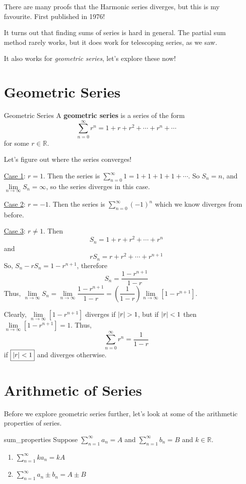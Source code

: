 \begin{Remark}{}{}
    There are many proofs that the Harmonic series diverges, but this is my favourite.
    First published in 1976!
\end{Remark}
It turns out that finding sums of series is hard in general. The partial
sum method rarely works, but it does work for telescoping series, as we saw.

It also works for \emph{geometric series}, let's explore these now!

\section{Geometric Series}
\begin{Definition}{Geometric Series}{}
    A \textbf{geometric series} is a series of the form
    \[ \sum\limits_{n=0}^{\infty} r^n=1+r+r^2+\cdots+r^n+\cdots \]
    for some $ r\in\mathbb{R} $.
\end{Definition}
Let's figure out where the series converges!

\underline{Case 1}: $ r=1 $. Then the series is
$ \sum\limits_{n=0}^{\infty} 1=1+1+1+1+\cdots $.
So $ S_n=n $, and $ \lim\limits_{{n} \to {\infty}} S_n =\infty $, so the series
diverges in this case.

\underline{Case 2}: $ r=-1 $. Then the series is $ \sum\limits_{n=0}^{\infty} (-1)^n $
which we know diverges from before.

\underline{Case 3}: $ r\neq 1 $. Then
\[ S_n=1+r+r^2+\cdots+r^n \]
and
\[ rS_n=r+r^2+\cdots+r^{n+1} \]
So, $ S_n-rS_n=1-r^{n+1} $, therefore
\[ S_n=\frac{1-r^{n+1}}{1-r} \]
Thus, $ \lim\limits_{{n} \to {\infty}} S_n=\lim\limits_{{n} \to {\infty}} \dfrac{1-r^{n+1}}{1-r}
    =
    \left( \dfrac{1}{1-r} \right) \lim\limits_{{n} \to {\infty}} \left[1-r^{n+1}\right] $.

Clearly, $ \lim\limits_{{n} \to {\infty}} \left[1-r^{n+1}\right] $ diverges if $ \lvert r\rvert>1 $,
but if $ \lvert r\rvert<1 $ then $ \lim\limits_{{n} \to {\infty}} \left[1-r^{n+1}\right]=1 $.
Thus,
\[ \boxed{ \sum\limits_{n=0}^{\infty} r^n=\frac{1}{1-r}} \]
if $ \boxed{\lvert r\rvert<1} $ and diverges otherwise.

\section{Arithmetic of Series}
Before we explore geometric series further, let's look at some
of the arithmetic properties of series.

\begin{Theorem}{}{sum_properties}
    Suppose $ \sum\limits_{n=1}^{\infty} a_n=A $ and $ \sum\limits_{n=1}^{\infty} b_n=B $
    and $ k\in\mathbb{R} $.
    \begin{enumerate}[label=(\arabic*)]
        \item $ \sum\limits_{n=1}^{\infty} ka_n=kA $
        \item $ \sum\limits_{n=1}^{\infty} a_n\pm b_n=A\pm B $
    \end{enumerate}
\end{Theorem}

